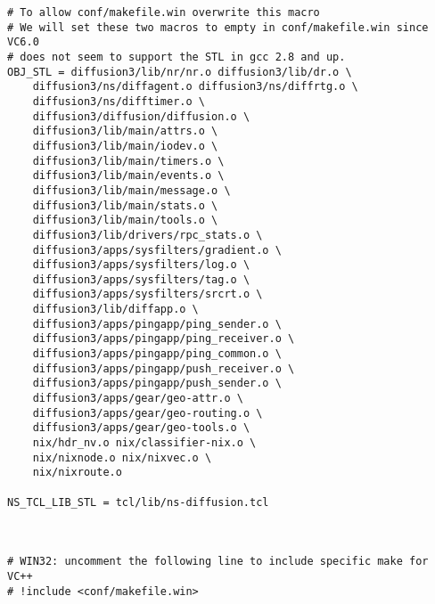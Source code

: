 \begin{verbatim}
# To allow conf/makefile.win overwrite this macro
# We will set these two macros to empty in conf/makefile.win since VC6.0
# does not seem to support the STL in gcc 2.8 and up. 
OBJ_STL = diffusion3/lib/nr/nr.o diffusion3/lib/dr.o \
	diffusion3/ns/diffagent.o diffusion3/ns/diffrtg.o \
	diffusion3/ns/difftimer.o \
	diffusion3/diffusion/diffusion.o \
	diffusion3/lib/main/attrs.o \
	diffusion3/lib/main/iodev.o \
	diffusion3/lib/main/timers.o \
	diffusion3/lib/main/events.o \
	diffusion3/lib/main/message.o \
	diffusion3/lib/main/stats.o \
	diffusion3/lib/main/tools.o \
	diffusion3/lib/drivers/rpc_stats.o \
	diffusion3/apps/sysfilters/gradient.o \
	diffusion3/apps/sysfilters/log.o \
	diffusion3/apps/sysfilters/tag.o \
	diffusion3/apps/sysfilters/srcrt.o \
	diffusion3/lib/diffapp.o \
	diffusion3/apps/pingapp/ping_sender.o \
	diffusion3/apps/pingapp/ping_receiver.o \
	diffusion3/apps/pingapp/ping_common.o \
	diffusion3/apps/pingapp/push_receiver.o \
	diffusion3/apps/pingapp/push_sender.o \
	diffusion3/apps/gear/geo-attr.o \
	diffusion3/apps/gear/geo-routing.o \
	diffusion3/apps/gear/geo-tools.o \
	nix/hdr_nv.o nix/classifier-nix.o \
	nix/nixnode.o nix/nixvec.o \
	nix/nixroute.o

NS_TCL_LIB_STL = tcl/lib/ns-diffusion.tcl 



# WIN32: uncomment the following line to include specific make for VC++
# !include <conf/makefile.win>


\end{verbatim}
